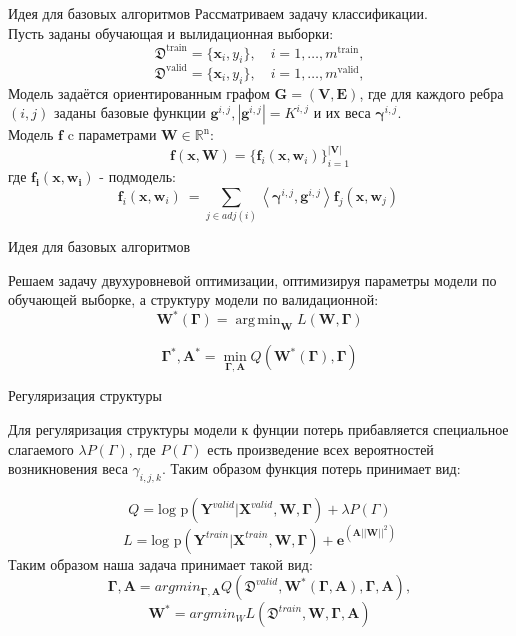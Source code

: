 \documentclass[10pt]{beamer}
\DeclareMathOperator*{\argmin}{arg\,min}
\begin{document}
\begin{frame}{Идея для базовых алгоритмов}
Рассматриваем задачу классификации.\\
Пусть заданы обучающая и вылидационная выборки:
\[
\mathfrak{D}^{\text{train}} = \{\mathbf{x}_i, y_i\}, \quad i=1,\dots,m^{\text{train}},
\]
\[
\mathfrak{D}^{\text{valid}} = \{\mathbf{x}_i, y_i\}, \quad i=1,\dots,m^{\text{valid}},
\]
 Модель задаётся ориентированным графом $\mathbf{G=(V,E)}$, где для каждого ребра $(i,j)$ заданы базовые функции $\mathbf{g}^{i,j}, |\mathbf{g}^{i,j}| = K^{i,j}$ и их веса $\boldsymbol{\gamma}^{i,j}$.\\ Модель $\mathbf{f}$ c параметрами $\mathbf{W}\in\mathbb{R}^\text{n}$:
\[
\mathbf{f}(\mathbf{x}, \mathbf{W})= \{ \mathbf{f}_i(\mathbf{x}, \mathbf{w}_i)\}_{i=1}^\mathbf{|V|}
\]
где $\mathbf{f_i(x, w_i)}$ - подмодель:
\[
\mathbf{f}_i(\mathbf{x}, \mathbf{w}_i)\ = \sum_{j\in adj(i)} \left\langle {\boldsymbol{\gamma}^{i,j}, \mathbf{g}^{i,j}} \right\rangle \mathbf{f}_j(\mathbf{x}, \mathbf{w}_j)\
\]

\end{frame}
\begin{frame}{Идея для базовых алгоритмов}

Решаем задачу двухуровневой оптимизации, оптимизируя параметры модели по обучающей выборке, а структуру модели по валидационной: 
\[
\mathbf{W}^*( \boldsymbol{\Gamma}) = \argmin_{\mathbf{W}}
L (\mathbf{W}, \boldsymbol{\Gamma})\]

\[
\boldsymbol{\Gamma}^*, \mathbf{A}^* = \min_{\boldsymbol{\Gamma}, \mathbf{A}} Q (\mathbf{W}^*( \boldsymbol{\Gamma}), \boldsymbol{\Gamma})
\]



\end{frame}
\begin{frame}{Регуляризация структуры}

Для регуляризация структуры модели к фунции потерь прибавляется специальное слагаемого $\lambda P(\Gamma)$, где $P(\Gamma)$ есть произведение всех вероятностей возникновения веса $\gamma_{i, j, k}$.
Таким образом функция потерь принимает вид:

\[
Q = \text{log p}(\mathbf{Y}^{valid}|\mathbf{X}^{valid}, \mathbf{W}, \boldsymbol{\Gamma}) + \lambda P(\Gamma)
\]
\[
L = \text{log p}(\mathbf{Y}^{train}|\mathbf{X}^{train}, \mathbf{W}, \boldsymbol{\Gamma}) + \boldsymbol{e}^{(\mathbf{A}||\mathbf{W}||^2)} 
\]
Таким образом наша задача принимает такой вид: \\
$$\boldsymbol{\Gamma},\mathbf{A} = argmin_{\boldsymbol{\Gamma},\mathbf{A}} Q(\mathfrak{D}^{valid},\mathbf{W^*(\boldsymbol{\Gamma},\mathbf{A})},\boldsymbol{\Gamma},\mathbf{A}),$$
$$\mathbf{W^*} = argmin_W L(\mathfrak{D}^{train},\mathbf{W},\boldsymbol{\Gamma},\mathbf{A})$$

\end{frame}
\end{document}
